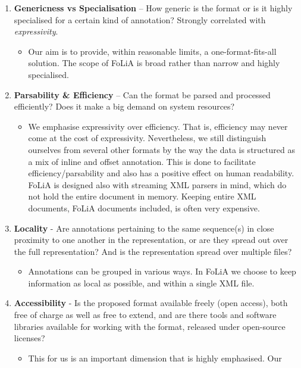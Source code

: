 \documentclass[a4paper,10pt,twoside]{article}
\begin{document}
\begin{enumerate}
\setcounter{enumi}{\theenumTemp}
\item \textbf{Genericness vs Specialisation} -- How generic is the format or is it highly specialised
  for a certain kind of annotation? Strongly correlated with
  \emph{expressivity}.
  \begin{itemize}
    \item[] Our aim is to provide, within reasonable limits, a
      one-format-fits-all solution. The scope of FoLiA is broad rather than
      narrow and highly specialised.
   \end{itemize}
\item \textbf{Parsability \& Efficiency} -- Can the format be parsed and
  processed efficiently? Does it make a big demand on system resources?
  \begin{itemize}
    \item[] We emphasise expressivity over efficiency. That is, efficiency may
      never come at the cost of expressivity. Nevertheless, we still
      distinguish ourselves from several other formats by the way the data is
      structured as a mix of inline and offset annotation. This is done to
      facilitate efficiency/parsability and also has a positive effect on human
      readability. FoLiA is designed also with streaming XML parsers in mind,
      which do not hold the entire document in memory. Keeping entire XML
      documents, FoLiA documents included, is often very expensive.
  \end{itemize}
\item \textbf{Locality} - Are annotations pertaining to the same sequence(s) in
  close proximity to one another in the representation, or are they spread out
  over the full representation? And is the representation spread over multiple
  files?
  \begin{itemize}
    \item[] Annotations can be grouped in various ways. In FoLiA we choose to
      keep information as local as possible, and within a single XML file.
  \end{itemize}
\item \textbf{Accessibility} - Is the proposed format available freely (open
  access), both free of charge as well as free to extend, and are there tools and
  software libraries available for working with the format, released under
  open-source licenses? 
  \begin{itemize}
    \item[] This for us is an important dimension that is highly emphasised. Our

\end{itemize}
\end{enumerate}
\end{document}
